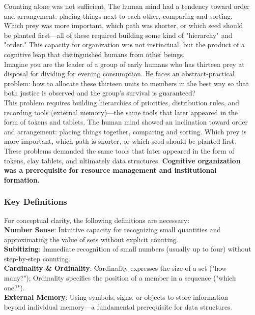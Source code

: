 Counting alone was not sufficient. The human mind had a tendency toward order and arrangement: placing things next to each other, comparing and sorting. Which prey was more important, which path was shorter, or which seed should be planted first—all of these required building some kind of "hierarchy" and "order." This capacity for organization was not instinctual, but the product of a cognitive leap that distinguished humans from other beings.\\
Imagine you are the leader of a group of early humans who has thirteen prey at disposal for dividing for evening consumption. He faces an abstract-practical problem: how to allocate these thirteen units to members in the best way so that both justice is observed and the group's survival is guaranteed?\\
This problem requires building hierarchies of priorities, distribution rules, and recording tools (external memory)—the same tools that later appeared in the form of tokens and tablets. The human mind showed an inclination toward order and arrangement: placing things together, comparing and sorting. Which prey is more important, which path is shorter, or which seed should be planted first.\\
These problems demanded the same tools that later appeared in the form of tokens, clay tablets, and ultimately data structures. \textbf{Cognitive organization was a prerequisite for resource management and institutional formation.}

\subsubsection{Key Definitions}

For conceptual clarity, the following definitions are necessary:\\
\textbf{Number Sense}: Intuitive capacity for recognizing small quantities and approximating the value of sets without explicit counting.\\
\textbf{Subitizing}: Immediate recognition of small numbers (usually up to four) without step-by-step counting.\\
\textbf{Cardinality \& Ordinality}: Cardinality expresses the size of a set ("how many?"); Ordinality specifies the position of a member in a sequence ("which one?").\\
\textbf{External Memory}: Using symbols, signs, or objects to store information beyond individual memory—a fundamental prerequisite for data structures.

